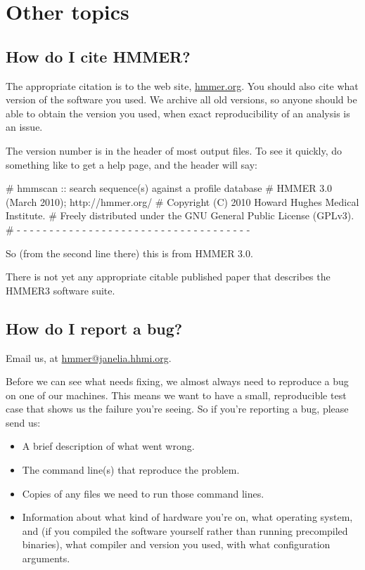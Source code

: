 
\section{Other topics}
\label{section:more}
\setcounter{footnote}{0}

\subsection{How do I cite HMMER?}

The appropriate citation is to the web site, \url{hmmer.org}. You
should also cite what version of the software you used. We archive all
old versions, so anyone should be able to obtain the version you used,
when exact reproducibility of an analysis is an issue. 

The version number is in the header of most output files. To see it
quickly, do something like  to get a help page, and
the header will say:

\begin{sreoutput}
# hmmscan :: search sequence(s) against a profile database
# HMMER 3.0 (March 2010); http://hmmer.org/
# Copyright (C) 2010 Howard Hughes Medical Institute.
# Freely distributed under the GNU General Public License (GPLv3).
# - - - - - - - - - - - - - - - - - - - - - - - - - - - - - - - - - - - -
\end{sreoutput}

So (from the second line there) this is from HMMER 3.0.

There is not yet any appropriate citable published paper that
describes the HMMER3 software suite.


\subsection{How do I report a bug?}

Email us, at \url{hmmer@janelia.hhmi.org}.

Before we can see what needs fixing, we almost always need to
reproduce a bug on one of our machines. This means we want to have a
small, reproducible test case that shows us the failure you're seeing.
So if you're reporting a bug, please send us:

\begin{itemize}
 \item A brief description of what went wrong.
 \item The command line(s) that reproduce the problem.
 \item Copies of any files we need to run those command lines.
 \item Information about what kind of hardware you're on, what
   operating system, and (if you compiled the software yourself rather
   than running precompiled binaries), what compiler and version you
   used, with what configuration arguments.
\end{itemize}

